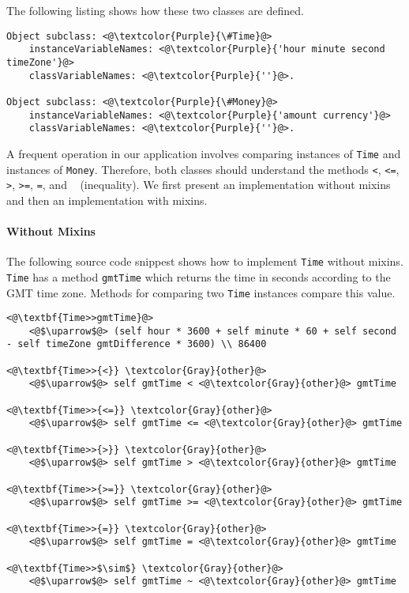 \documentclass[12pt]{article}
\begin{document}
The following listing shows how these two classes are defined.
\begin{lstlisting}
Object subclass: <@\textcolor{Purple}{\#Time}@>
    instanceVariableNames: <@\textcolor{Purple}{'hour minute second timeZone'}@>
    classVariableNames: <@\textcolor{Purple}{''}@>.
    
Object subclass: <@\textcolor{Purple}{\#Money}@>
    instanceVariableNames: <@\textcolor{Purple}{'amount currency'}@>
    classVariableNames: <@\textcolor{Purple}{''}@>.
\end{lstlisting}

A frequent operation in our application involves comparing instances of \texttt{Time} and instances of \texttt{Money}. Therefore, both classes should understand the methods \texttt{<}, \texttt{<=}, \texttt{>}, \texttt{>=}, \texttt{=}, and \texttt{~} (inequality). We first present an implementation without mixins and then an implementation with mixins.

\paragraph{Without Mixins}
The following source code snippest shows how to implement \texttt{Time} without mixins. \texttt{Time} has a method \texttt{gmtTime} which returns the time in seconds according to the GMT time zone. Methods for comparing two \texttt{Time} instances compare this value.
\begin{lstlisting}
<@\textbf{Time>>gmtTime}@>
    <@$\uparrow$@> (self hour * 3600 + self minute * 60 + self second - self timeZone gmtDifference * 3600) \\ 86400

<@\textbf{Time>>{<}} \textcolor{Gray}{other}@>
    <@$\uparrow$@> self gmtTime < <@\textcolor{Gray}{other}@> gmtTime

<@\textbf{Time>>{<=}} \textcolor{Gray}{other}@>
    <@$\uparrow$@> self gmtTime <= <@\textcolor{Gray}{other}@> gmtTime
    
<@\textbf{Time>>{>}} \textcolor{Gray}{other}@>
    <@$\uparrow$@> self gmtTime > <@\textcolor{Gray}{other}@> gmtTime
    
<@\textbf{Time>>{>=}} \textcolor{Gray}{other}@>
    <@$\uparrow$@> self gmtTime >= <@\textcolor{Gray}{other}@> gmtTime
    
<@\textbf{Time>>{=}} \textcolor{Gray}{other}@>
    <@$\uparrow$@> self gmtTime = <@\textcolor{Gray}{other}@> gmtTime
    
<@\textbf{Time>>$\sim$} \textcolor{Gray}{other}@>
    <@$\uparrow$@> self gmtTime ~ <@\textcolor{Gray}{other}@> gmtTime
\end{lstlisting}
\end{document}

